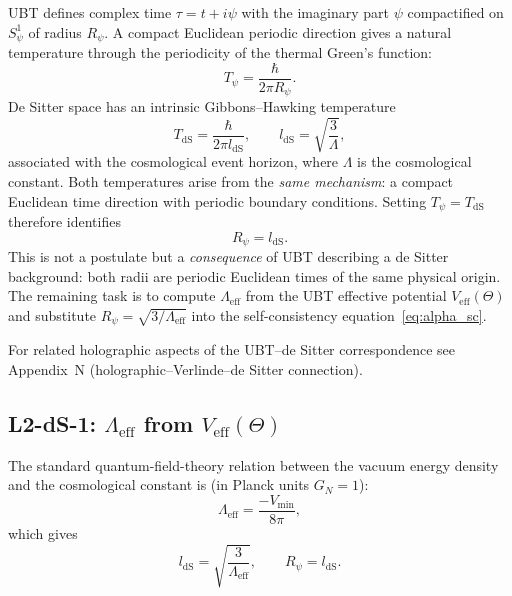 \documentclass[11pt,a4paper]{article}
\theoremstyle{definition}
\theoremstyle{remark}
\begin{document}
UBT defines complex time $\tau = t + i\psi$ with the imaginary part
$\psi$ compactified on $S^1_\psi$ of radius $R_\psi$.
A compact Euclidean periodic direction gives a natural temperature through
the periodicity of the thermal Green's function:
\begin{equation}
  T_\psi = \frac{\hbar}{2\pi R_\psi}.
\end{equation}
De Sitter space has an intrinsic Gibbons--Hawking temperature
\begin{equation}
  T_{\mathrm{dS}} = \frac{\hbar}{2\pi l_{\mathrm{dS}}},
  \qquad
  l_{\mathrm{dS}} = \sqrt{\frac{3}{\Lambda}},
\end{equation}
associated with the cosmological event horizon, where $\Lambda$ is the
cosmological constant.
Both temperatures arise from the \emph{same mechanism}: a compact Euclidean
time direction with periodic boundary conditions.
Setting $T_\psi = T_{\mathrm{dS}}$ therefore identifies
\begin{equation}
  \boxed{R_\psi = l_{\mathrm{dS}}.}
  \label{eq:Rpsi_ldS}
\end{equation}
This is not a postulate but a \emph{consequence} of UBT describing a de Sitter
background: both radii are periodic Euclidean times of the same physical
origin.  The remaining task is to compute $\Lambda_{\mathrm{eff}}$ from the
UBT effective potential $V_{\mathrm{eff}}(\Theta)$ and substitute
$R_\psi = \sqrt{3/\Lambda_{\mathrm{eff}}}$ into the self-consistency
equation~\eqref{eq:alpha_sc}.

For related holographic aspects of the UBT--de Sitter correspondence see
Appendix~N (holographic--Verlinde--de Sitter connection).

\subsection{L2-dS-1: $\Lambda_{\mathrm{eff}}$ from $V_{\mathrm{eff}}(\Theta)$}
\label{subsec:L2dS1}

The standard quantum-field-theory relation between the vacuum energy
density and the cosmological constant is (in Planck units $G_N=1$):
\begin{equation}
  \Lambda_{\mathrm{eff}} = \frac{-V_{\min}}{8\pi},
  \label{eq:Lambda_from_Vmin}
\end{equation}
which gives
\begin{equation}
  l_{\mathrm{dS}} = \sqrt{\frac{3}{\Lambda_{\mathrm{eff}}}},
  \qquad
  R_\psi = l_{\mathrm{dS}}.
\end{equation}
\end{document}
